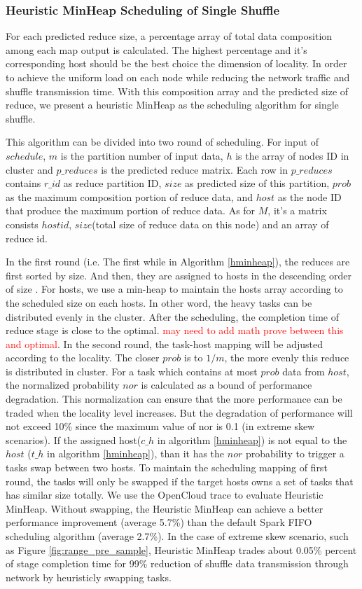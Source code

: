 \subsubsection{Heuristic MinHeap Scheduling of Single Shuffle}\label{h-minheap}
For each predicted reduce size, a percentage array of total data composition among each map output is calculated. The highest percentage and it's corresponding host should be the best choice the dimension of locality. In order to achieve the uniform load on each node while reducing the network traffic and shuffle transmission time. With this composition array and the predicted size of reduce, we present a heuristic MinHeap as the scheduling algorithm for single shuffle.

This algorithm can be divided into two round of scheduling. For input of $schedule$, $m$ is the partition number of input data, $h$ is the array of nodes ID in cluster and $p\_reduces$ is the predicted reduce matrix. Each row in $p\_reduces$ contains $r\_id$ as reduce partition ID, $size$ as predicted size of this partition, $prob$ as the maximum composition portion of reduce data, and $host$ as the node ID that produce the maximum portion of reduce data. As for $M$, it's a matrix consists $hostid$, $size$(total size of reduce data on this node) and an array of reduce id. 

In the first round (i.e. The first while in Algorithm \ref{hminheap}), the reduces are first sorted by size. And then, they are assigned to hosts in the descending order of size . For hosts, we use a min-heap to maintain the hosts array according to the scheduled size on each hosts. In other word, the heavy tasks can be distributed evenly in the cluster.  After the scheduling, the completion time of reduce stage is close to the optimal. \textcolor{red}{may need to add math prove between this and optimal}. In the second round, the task-host mapping will be adjusted according to the locality. The closer $prob$ is to $1/m$, the more evenly this reduce is distributed in cluster. For a task which contains at most $prob$ data from $host$, the normalized probability $nor$ is calculated as a bound of performance degradation. This normalization can ensure that the more performance can be traded when the locality level increases. But the degradation of performance will not exceed 10\% since the maximum value of nor is 0.1 (in extreme skew scenarios).  If the assigned host($c\_h$ in algorithm \ref{hminheap}) is not equal to the $host$ ($t\_h$ in algorithm \ref{hminheap}), than it has the $nor$ probability to trigger a tasks swap between two hosts. To maintain the scheduling mapping of first round, the tasks will only be swapped if the target hosts owns a set of tasks that has similar size totally. We use the OpenCloud\cite{opencloudtrace} trace to evaluate Heuristic MinHeap. Without swapping, the Heuristic MinHeap can achieve a better performance improvement (average 5.7\%) than the default Spark FIFO scheduling algorithm (average 2.7\%). In the case of extreme skew scenario, such as Figure \ref{fig:range_pre_sample}, Heuristic MinHeap trades about 0.05\% percent of stage completion time for 99\% reduction of shuffle data transmission through network by heuristicly swapping tasks.

